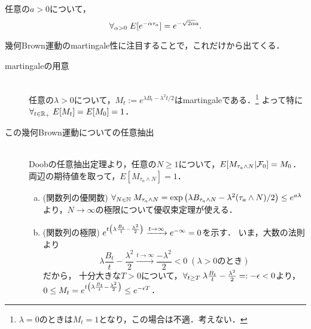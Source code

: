 \documentclass[uplatex,dvipdfmx]{jsreport}
\begin{document}
\begin{proposition}\label{prop-hitting-time}
    任意の$a>0$について，
    \[\forall_{\alpha>0}\;E[e^{-\alpha\tau_a}]=e^{-\sqrt{2\alpha}a}.\]
\end{proposition}
\begin{Proof}
    幾何Brown運動のmartingale性に注目することで，これだけから出てくる．
    \begin{description}
        \item[martingaleの用意] \mbox{}\\
        任意の$\lambda>0$について，$M_t:=e^{\lambda B_t-\lambda^2t/2}$はmartingaleである．\footnote{$\lambda=0$のときは$M_t=1$となり，この場合は不適．考えない．}
        よって特に$\forall_{t\in\mathbb{R}_+}\;E[M_t]=E[M_0]=1$．
        \item[この幾何Brown運動についての任意抽出] \mbox{}\\
        Doobの任意抽出定理より，任意の$N\ge 1$について，$E[M_{\tau_a\land N}|\mathcal{F}_0]=M_0$．両辺の期待値を取って，$E[M_{\tau_a\land N}]=1$．
        \begin{enumerate}[(a)]
            \item (関数列の優関数)  $\forall_{N\in\mathbb{N}}\;M_{\tau_a\land N}=\exp\left(\lambda B_{\tau_a\land N}-\lambda^2(\tau_a\land N)/2\right)\le e^{a\lambda}$より，$N\to\infty$の極限について優収束定理が使える．
            \item (関数列の極限) $e^{t\left(\lambda\frac{B_t}{t}-\frac{\lambda^2}{2}\right)}\xrightarrow{t\to\infty}e^{-\infty}=0$を示す．
            いま，大数の法則より\[\lambda\frac{B_t}{t}-\frac{\lambda^2}{2}\xrightarrow{t\to\infty}\frac{-\lambda^2}{2}<0\;(\lambda>0\text{のとき})\]だから，
            十分大きな$T>0$について，$\forall_{t\ge T}\;\lambda\frac{B_t}{t}-\frac{\lambda^2}{2}=:-\epsilon<0$より，$0\le M_t=e^{t\left(\lambda\frac{B_t}{t}-\frac{\lambda^2}{2}\right)}\le e^{-\epsilon T}$．
            

\end{enumerate}
\end{description}
\end{Proof}
\end{document}
